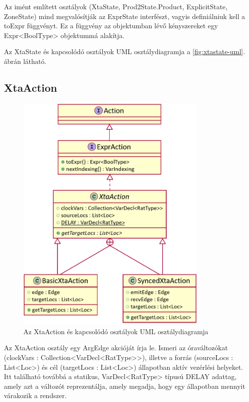 Az imént említett osztályok (\textsf{XtaState}, \textsf{Prod2State.Product}, \textsf{ExplicitState}, \textsf{ZoneState}) mind megvalósítják az \textsf{ExprState} interfészt, vagyis definiálniuk kell a \textsf{toExpr} függvényt. Ez a függvény az objektumban lévő kényszereket egy \textsf{Expr<BoolType>} objektummá alakítja.

Az \textsf{XtaState} és kapcsolódó osztályok UML osztálydiagramja a \ref{fig:xtastate-uml}. ábrán látható.

\subsection{XtaAction}
\begin{figure}%
    \centering
    \includegraphics[height=120mm, keepaspectratio]{src/figures/xtaaction-uml.png}
    \caption{Az \textsf{XtaAction} és kapcsolódó osztályok UML osztálydiagramja}
    \label{fig:xtaaction-uml}
\end{figure}

Az \textsf{XtaAction} osztály egy \textsf{ArgEdge} akcióját írja le. Ismeri az óraváltozókat (\textsf{clockVars : Collection<VarDecl<RatType>{}>}), illetve a forrás (\textsf{sourceLocs : List<Loc>}) és cél (\textsf{targetLocs : List<Loc>}) állapotban aktív vezérlési helyeket. Itt található továbbá a statikus, \textsf{VarDecl<RatType>} típusú \textsf{DELAY} adattag, amely azt a változót reprezentálja, amely megadja, hogy egy állapotban mennyit várakozik a rendszer.

